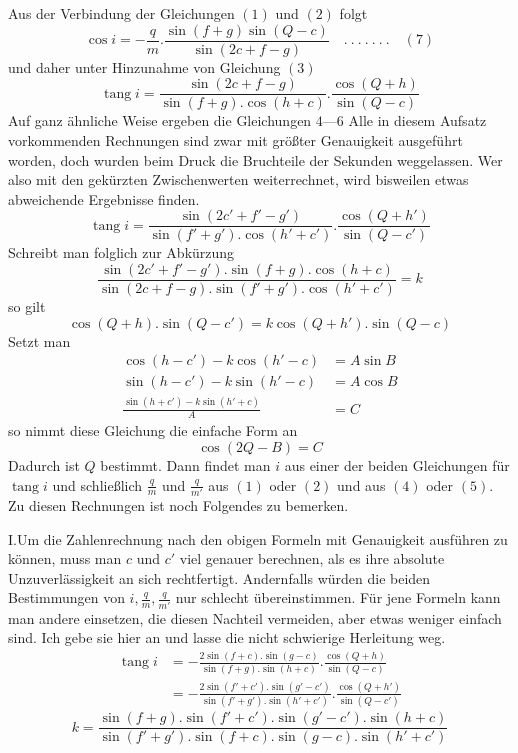 Aus der Verbindung der Gleichungen $(1)$ und $(2)$ folgt
\[
\cos i=-\frac{q}{m}.\frac{\sin(f+g)\sin(Q-c)}{\sin(2c+f-g)}\quad.\ .\ .\ .\ .\ .\ .\quad(7)
\]
und daher unter Hinzunahme von Gleichung $(3)$
\[
\operatorname{tang}i=\frac{\sin(2c+f-g)}{\sin(f+g).\cos(h+c)}.\frac{\cos(Q+h)}{\sin(Q-c)}
\]
Auf ganz ähnliche Weise ergeben die Gleichungen $4$---$6$
\expandafter\def\csname HistoricalNoteText473\endcsname{Alle in diesem Aufsatz vorkommenden Rechnungen sind zwar mit größter Genauigkeit ausgeführt worden, doch wurden beim Druck die Bruchteile der Sekunden weggelassen. Wer also mit den gekürzten Zwischenwerten weiterrechnet, wird bisweilen etwas abweichende Ergebnisse finden.}
\[
\operatorname{tang}i=\frac{\sin(2c'+f'-g')}{\sin(f'+g').\cos(h'+c')}.\frac{\cos(Q+h')}{\sin(Q-c')}
\]
Schreibt man folglich zur Abkürzung
\[
\frac{\sin(2c'+f'-g').\sin(f+g).\cos(h+c)}{\sin(2c+f-g).\sin(f'+g').\cos(h'+c')}=k
\]
so gilt
\[
\cos(Q+h).\sin(Q-c')=k\cos(Q+h').\sin(Q-c)
\]
Setzt man
\[
\begin{aligned}
\cos(h-c')-k\cos(h'-c)&=A\sin B\\
\sin(h-c')-k\sin(h'-c)&=A\cos B\\
\frac{\sin(h+c')-k\sin(h'+c)}{A}&=C
\end{aligned}
\]
so nimmt diese Gleichung die einfache Form an
\[
\cos(2Q-B)=C
\]
Dadurch ist $Q$ bestimmt. Dann findet man $i$ aus einer der beiden Gleichungen für $\operatorname{tang}i$ und schließlich $\frac{q}{m}$ und $\frac{q}{m'}$ aus $(1)$ oder $(2)$ und aus $(4)$ oder $(5)$. Zu diesen Rechnungen ist noch Folgendes zu bemerken.

I.\quad Um die Zahlenrechnung nach den obigen Formeln mit Genauigkeit ausführen zu können, muss man $c$ und $c'$ viel genauer berechnen, als es ihre absolute Unzuverlässigkeit an sich rechtfertigt. Andernfalls würden die beiden Bestimmungen von $i,\frac{q}{m},\frac{q}{m'}$ nur schlecht übereinstimmen. Für jene Formeln kann man andere einsetzen, die diesen Nachteil vermeiden, aber etwas weniger einfach sind. Ich gebe sie hier an und lasse die nicht schwierige Herleitung weg.
\[
\begin{aligned}
\operatorname{tang}i&=-\frac{2\sin(f+c).\sin(g-c)}{\sin(f+g).\sin(h+c)}.\frac{\cos(Q+h)}{\sin(Q-c)}\\
&=-\frac{2\sin(f'+c').\sin(g'-c')}{\sin(f'+g').\sin(h'+c')}.\frac{\cos(Q+h')}{\sin(Q-c')}
\end{aligned}
\]
\[
k=\frac{\sin(f+g).\sin(f'+c').\sin(g'-c').\sin(h+c)}{\sin(f'+g').\sin(f+c).\sin(g-c).\sin(h'+c')}
\]

